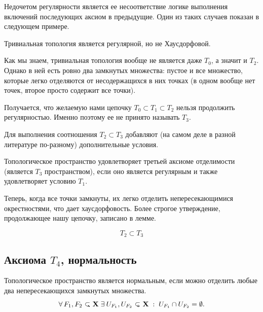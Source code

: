 Недочетом регулярности является ее несоответствие логике выполнения включений последующих аксиом в предыдущие. Один из таких случаев показан в следующем примере.
\begin{Ex}
    Тривиальная топология является регулярной, но не Хаусдорфовой.

    Как мы знаем, тривиальная топология вообще не является даже $T_0$, а значит и $T_2$. Однако в ней есть ровно два замкнутых множества: пустое и все множество, которые легко отделяются от несодержащихся в них точках (в одном вообще нет точек, второе просто содержит все точки).
\end{Ex}

\begin{Note}
    Получается, что желаемую нами цепочку $T_0 \subset T_1 \subset T_2$ нельзя продолжить регулярностью. Именно поэтому ее не принято называть $T_3$. 

    Для выполнения соотношения  $T_2 \subset T_3$ добавляют (на самом деле в разной литературе по-разному) дополнительные условия.
\end{Note}

\begin{Def}
    [Аксиома $T_3$]
    Топологическое пространство \topX удовлетворяет третьей аксиоме отделимости (является $T_3$ пространством), если оно является регулярным и также удовлетворяет условию  $T_1$.
\end{Def}

Теперь, когда все точки замкнуты, их легко отделить непересекающимися окрестностями, что дает хаусдорфовость. Более строгое утверждение, продолжающее нашу цепочку, записано в лемме.
\begin{Lem}
\[T_2 \subset T_3\]
\end{Lem}

\subsection{Аксиома $T_4$, нормальность}
\begin{Def}
    [Нормальность]
    Топологическое пространство \topX является нормальным, если можно отделить любые два непересекающихся замкнутых множества.
    \[
        \forall F_1, F_2 \closed \X \; \exists U_{F_1}, U_{F_2} \open \X \st U_{F_1} \cap U_{F_2} = \emptyset.
    \] 
\end{Def}

